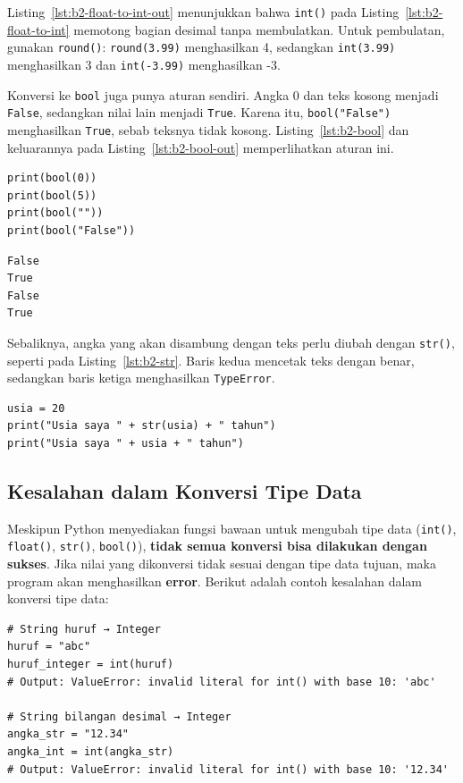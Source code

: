 Listing~\ref{lst:b2-float-to-int-out} menunjukkan bahwa \texttt{int()} pada Listing~\ref{lst:b2-float-to-int} memotong bagian desimal tanpa membulatkan. Untuk pembulatan, gunakan \texttt{round()}: \texttt{round(3.99)} menghasilkan 4, sedangkan \texttt{int(3.99)} menghasilkan 3 dan \texttt{int(-3.99)} menghasilkan -3.

Konversi ke \texttt{bool} juga punya aturan sendiri. Angka 0 dan teks kosong menjadi \texttt{False}, sedangkan nilai lain menjadi \texttt{True}. Karena itu, \texttt{bool("False")} menghasilkan \texttt{True}, sebab teksnya tidak kosong. Listing~\ref{lst:b2-bool} dan keluarannya pada Listing~\ref{lst:b2-bool-out} memperlihatkan aturan ini.

\begin{lstlisting}[style=PythonStyle, caption={Kode Python: konversi_bool.py}, label={lst:b2-bool}]
print(bool(0))
print(bool(5))
print(bool(""))
print(bool("False"))
\end{lstlisting}

\begin{lstlisting}[language=bash, caption={Keluaran konversi_bool.py}, label={lst:b2-bool-out}]
False
True
False
True
\end{lstlisting}

Sebaliknya, angka yang akan disambung dengan teks perlu diubah dengan \texttt{str()}, seperti pada Listing~\ref{lst:b2-str}. Baris kedua mencetak teks dengan benar, sedangkan baris ketiga menghasilkan \texttt{TypeError}.

\begin{lstlisting}[style=PythonStyle, caption={Kode Python: angka_ke_teks.py}, label={lst:b2-str}]
usia = 20
print("Usia saya " + str(usia) + " tahun")
print("Usia saya " + usia + " tahun")
\end{lstlisting}


\subsection{Kesalahan dalam Konversi Tipe Data}
Meskipun Python menyediakan fungsi bawaan untuk mengubah tipe data (\texttt{int()}, \texttt{float()}, \texttt{str()}, \texttt{bool()}), \textbf{tidak semua konversi bisa dilakukan dengan sukses}. Jika nilai yang dikonversi tidak sesuai dengan tipe data tujuan, maka program akan menghasilkan \textbf{error}. Berikut adalah contoh kesalahan dalam konversi tipe data:

\begin{lstlisting}[style=PythonStyle, caption={Kesalahan saat konversi ke integer}, label={lst:b2-konversi-salah}]
# String huruf → Integer
huruf = "abc"
huruf_integer = int(huruf) 
# Output: ValueError: invalid literal for int() with base 10: 'abc'

# String bilangan desimal → Integer
angka_str = "12.34"
angka_int = int(angka_str)  
# Output: ValueError: invalid literal for int() with base 10: '12.34'
\end{lstlisting}

